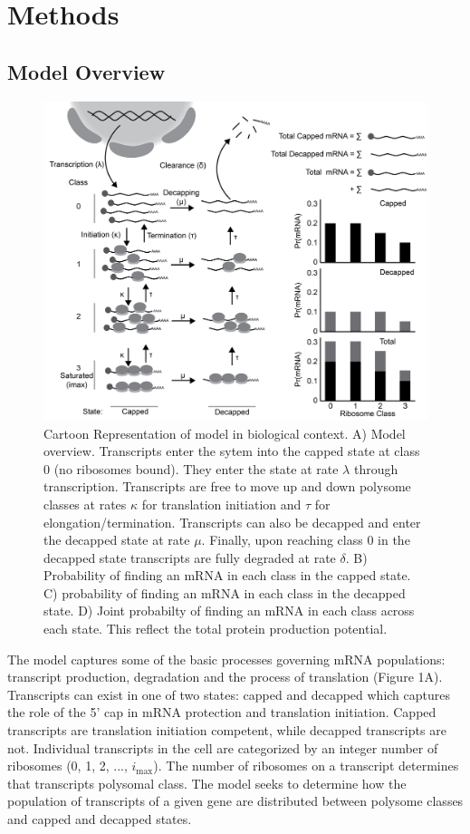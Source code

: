 \documentclass[review]{elsarticle}
\newcommand{\imax}{\ensuremath{{i_{\max}}}\xspace}
\begin{document}
\section{Methods}\label{sec:description}
\subsection{Model Overview}
\begin{figure}[!ht]
\centering
\includegraphics[width=150mm]{Images/Figure1_biomodel_V3.png}
\caption{Cartoon Representation of model in biological context. A) Model overview. Transcripts enter the sytem into the capped state at class 0 (no ribosomes bound). They enter the state at rate $\lambda$ through transcription. Transcripts are free to move up and down polysome classes at rates $\kappa$ for translation initiation and $\tau$ for elongation/termination. Transcripts can also be decapped and enter the decapped state at rate $\mu$. Finally, upon reaching class 0 in the decapped state transcripts are fully degraded at rate $\delta$. B) Probability of finding an mRNA in each class in the capped state. C) probability of finding an mRNA in each class in the decapped state. D) Joint probabilty of finding an mRNA in each class across each state. This reflect the total protein production potential.}
\end{figure}
\clearpage


The model captures some of the basic processes governing mRNA populations: transcript production, degradation and the process of translation (Figure 1A).
Transcripts can exist in one of two states: capped and decapped which captures the role of the 5' cap in mRNA protection and translation initiation. 
Capped transcripts are translation initiation competent, while decapped transcripts are not. 
Individual transcripts in the cell are categorized by an integer number of ribosomes (0, 1, 2, ..., \imax).
The number of ribosomes on a transcript determines that transcripts polysomal class.
The model seeks to determine how the population of transcripts of a given gene are distributed between polysome classes and capped and decapped states.
\end{document}
